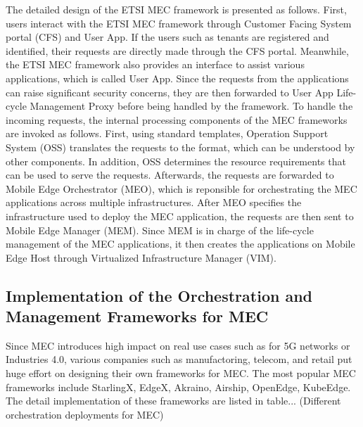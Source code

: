 The detailed design of the ETSI MEC framework is presented as follows. 
First, users interact with the ETSI MEC framework through Customer Facing System portal (CFS) and User App. If the users such as tenants are registered and identified, their requests are directly made through the CFS portal. Meanwhile, the ETSI MEC framework also provides an interface to assist various applications, which is called User App. Since the requests from the applications can raise significant security concerns, they are then forwarded to User App Life-cycle Management Proxy before being handled by the framework. To handle the incoming requests, the internal processing components of the MEC frameworks are invoked as follows. First, using standard templates, Operation Support System (OSS) translates the requests to the format, which can be understood by other components. In addition, OSS determines the resource requirements that can be used to serve the requests. Afterwards, the requests are forwarded to Mobile Edge Orchestrator (MEO), which is reponsible for orchestrating the MEC applications across multiple infrastructures. After MEO specifies the infrastructure used to deploy the MEC application, the requests are then sent to Mobile Edge Manager (MEM). Since MEM is in charge of the life-cycle management of the MEC applications, it then creates the applications on Mobile Edge Host through Virtualized Infrastructure Manager (VIM).   


\subsection{Implementation of the Orchestration and Management Frameworks for MEC}

Since MEC introduces high impact on real use cases such as for 5G networks or Industries 4.0, various companies such as manufactoring, telecom, and retail put huge effort on designing their own frameworks for MEC. The most popular MEC frameworks include StarlingX, EdgeX, Akraino, Airship, OpenEdge, KubeEdge. The detail implementation of these frameworks are listed in table... (Different orchestration deployments for MEC)

